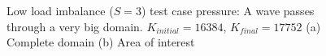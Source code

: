 \begin{figure}[H]
	\centering
	\hfill
	\caption{Low load imbalance (\(S = 3\)) test case pressure: A wave passes through a very big domain. \(K_{initial} = 16384\), \(K_{final} = 17752\) (a) Complete domain (b) Area of interest}\label{fig:load_imbalance_case_low_p}
\end{figure}

